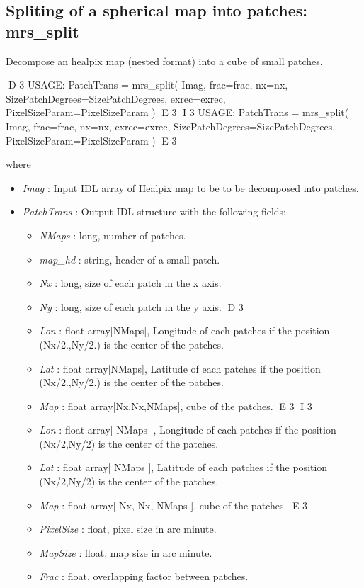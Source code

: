 \subsection{Spliting of a spherical map into patches: mrs\_split}
Decompose an healpix map (nested format) into a cube of small patches.
{\bf
\begin{center}
D 3
     USAGE: PatchTrans = mrs\_split( Imag, frac=frac, nx=nx, SizePatchDegrees=SizePatchDegrees, exrec=exrec, PixelSizeParam=PixelSizeParam )
E 3
I 3
     USAGE: PatchTrans = mrs\_split( Imag, frac=frac, nx=nx, exrec=exrec, SizePatchDegrees=SizePatchDegrees, PixelSizeParam=PixelSizeParam )
E 3
\end{center}}
where
\begin{itemize}
\item {\em Imag} : Input IDL array of Healpix map to be to be decomposed into patches.
\item {\em PatchTrans} : Output IDL structure with the following fields:
\begin{itemize}
\item {\em NMaps} : long, number of patches.
\item {\em map\_hd} : string, header of a small patch.
\item {\em Nx} : long, size of each patch in the x axis.
\item {\em Ny} : long, size of each patch in the y axis.
D 3
\item {\em Lon} : float array[NMaps], Longitude of each patches if the position (Nx/2.,Ny/2.) is the center of the patches.
\item {\em Lat} : float array[NMaps], Latitude of each patches if the position (Nx/2.,Ny/2.) is the center of the patches.
\item {\em Map} : float array[Nx,Nx,NMaps], cube of the patches.
E 3
I 3
\item {\em Lon} : float array[ NMaps ], Longitude of each patches if the position (Nx/2,Ny/2) is the center of the patches.
\item {\em Lat} : float array[ NMaps ], Latitude of each patches if the position (Nx/2,Ny/2) is the center of the patches.
\item {\em Map} : float array[ Nx, Nx, NMaps ], cube of the patches.
E 3
\item {\em PixelSize} : float, pixel size in arc minute.
\item {\em MapSize} : float, map size in arc minute.
\item {\em Frac} : float, overlapping factor between patches.

\end{itemize}
\end{itemize}
